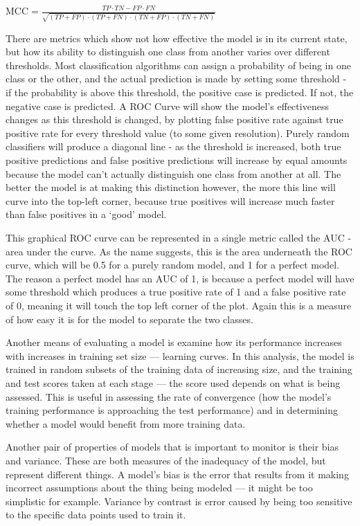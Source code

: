 $\mbox{MCC} = \frac{TP \cdot TN - FP \cdot FN}{\sqrt{(TP + FP) \cdot (TP + FN) \cdot (TN + FP) \cdot (TN + FN)}}$

There are metrics which show not how effective the model is in its current state, but how its ability to distinguish one class from another varies over different thresholds. Most classification algorithms can assign a probability of being in one class or the other, and the actual prediction is made by setting some threshold - if the probability is above this threshold, the positive case is predicted. If not, the negative case is predicted. A ROC Curve will show the model's effectiveness changes as this threshold is changed, by plotting false positive rate against true positive rate for every threshold value (to some given resolution). Purely random classifiers will produce a diagonal line - as the threshold is increased, both true positive predictions and false positive predictions will increase by equal amounts because the model can't actually distinguish one class from another at all. The better the model is at making this distinction however, the more this line will curve into the top-left corner, because true positives will increase much faster than false positives in a `good' model.

This graphical ROC curve can be represented in a single metric called the AUC - area under the curve. As the name suggests, this is the area underneath the ROC curve, which will be 0.5 for a purely random model, and 1 for a perfect model. The reason a perfect model has an AUC of 1, is because a perfect model will have some threshold which produces a true positive rate of 1 and a false positive rate of 0, meaning it will touch the top left corner of the plot. Again this is a measure of how easy it is for the model to separate the two classes.

Another means of evaluating a model is examine how its performance increases with increases in training set size --- learning curves. In this analysis, the model is trained in random subsets of the training data of increasing size, and the training and test scores taken at each stage --- the score used depends on what is being assessed. This is useful in assessing the rate of convergence (how the model's training performance is approaching the test performance) and in determining whether a model would benefit from more training data.

Another pair of properties of models that is important to monitor is their bias and variance. These are both measures of the inadequacy of the model, but represent different things. A model's bias is the error that results from it making incorrect assumptions about the thing being modeled --- it might be too simplistic for example. Variance by contrast is error caused by being too sensitive to the specific data points used to train it.


